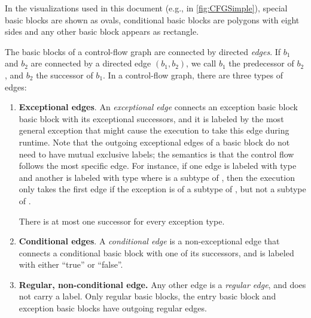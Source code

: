 In the visualizations used in this document (e.g., in \autoref{fig:CFGSimple}), special basic blocks are
shown as ovals, conditional basic blocks are polygons with eight sides and any
other basic block appears as rectangle.

\begin{definition}
\label{def:edges}
The basic blocks of a control-flow graph are connected by directed \emph{edges}.
If $b_1$ and $b_2$ are connected by a directed edge $(b_1,b_2)$, we call
$b_1$ the predecessor of $b_2$, and $b_2$ the successor of $b_1$.
In a control-flow graph, there are three types of edges:
\begin{enumerate}
    \item \textbf{Exceptional edges}. An \emph{exceptional edge} connects an exception basic block
    basic block with its exceptional successors, and it is labeled by the most
    general exception that might cause the execution to take this edge during runtime.
    Note that the outgoing exceptional edges of a basic block do not need to have mutual
    exclusive labels; the semantics is that the control flow follows the most specific
    edge. For instance, if one edge is labeled with type  and another is labeled
    with type  where  is a subtype of , then the execution only takes
    the first edge if the exception is of a subtype of , but not a subtype of .
    
    There is at most one successor for every exception type.
    \item \textbf{Conditional edges}. A \emph{conditional edge} is a non-exceptional
    edge that connects a conditional
    basic block with one of its successors, and is labeled with either ``true'' or
    ``false''.
    \item \textbf{Regular, non-conditional edge.} Any other edge is a \emph{regular edge}, and does not carry
    a label. Only regular basic blocks, the entry basic block and exception basic blocks have outgoing
    regular edges.
\end{enumerate}
\end{definition}


